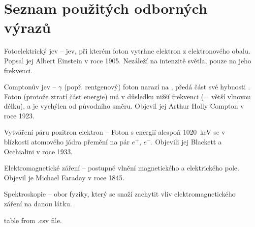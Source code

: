 \section*{Seznam použitých odborných výrazů}
\begin{list}{}{}
	\item [Fotoelektrický jev] -- jev, při kterém foton vytrhne elektron z elektronového obalu. Popsal jej Albert Einstein v roce 1905. Nezáleží na intenzitě světla, pouze na jeho frekvenci. 
	\item [Comptonův jev] -- $\gamma$ (popř. rentgenový) foton narazí na \e, předá část své hybnosti \e. Foton (protože ztratí část energie) má v důsledku nižší frekvenci (= větší vlnovou délku), a je vychýlen od původního směru. Objevil jej  Arthur Holly Compton v roce 1923.
	\item [Vytváření páru pozitron elektron] -- Foton s energií alespoň \SI{1020}{\kilo\electronvolt} se v blízkosti atomového jádra přemění na pár $e^{+}$, $e^{-}$. Objevili jej Blackett a Occhialini v roce 1933.
	\item [Elektromagnetické záření] -- postupné vlnění magnetického a elektrického pole. Objevil je Michael Faraday v roce 1845. 
	\item [Spektroskopie] -- obor fyziky, který se snaží zachytit vliv elektromagnetického záření na danou látku.
\end{list}
\newpage

\begin{table}[h!]
	\begin{center}
		\caption{table from .csv file.}
		\label{table1}
	\end{center}
\end{table}